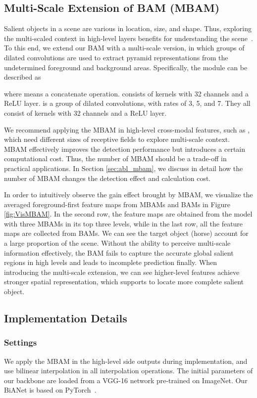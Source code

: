 \documentclass[journal]{IEEEtran}
\newcommand{\secref}[1]{Section \ref{#1}}
\newcommand{\figref}[1]{Figure \ref{#1}}
\begin{document}
\subsection{Multi-Scale Extension of BAM (MBAM)}\label{sec:MBAM}
Salient objects in a scene are various in location, size, and shape.
Thus, exploring the multi-scaled context in high-level layers benefits for understanding the scene~\cite{wang2019salinet,zhao2019pyramid}.
To this end, we extend our BAM with a multi-scale version, in which groups of dilated convolutions are used to extract pyramid representations from the undetermined foreground and background areas.
Specifically, the module can be described as

where  means a concatenate operation.
 consists of  kernels with 32 channels and a ReLU layer.
 is a group of dilated convolutions, with rates of 3, 5, and 7.
They all consist of  kernels with 32 channels and a ReLU layer.

We recommend applying the MBAM in high-level cross-modal features, such as ,
which need different sizes of receptive fields to explore multi-scale context.
MBAM effectively improves the detection performance but introduces a certain computational cost.
Thus, the number of MBAM should be a trade-off in practical applications. 
In \secref{sec:abl_mbam}, we discuss in detail how the number of MBAM changes the detection effect and calculation cost.


In order to intuitively observe the gain effect brought by MBAM,
we visualize the averaged foreground-first feature maps from MBAMs and BAMs in \figref{fig:VisMBAM}.
In the second row,
the feature maps are obtained from the model with three MBAMs in its top three levels,
while in the last row, 
all the feature maps are collected from BAMs. 
We can see the target object (horse) account for a large proportion of the scene.
Without the ability to perceive multi-scale information effectively,
the BAM fails to capture the accurate global salient regions in high levels
and leads to incomplete prediction finally.
When introducing the multi-scale extension, 
we can see higher-level features achieve stronger spatial representation,
which supports to locate more complete salient object.

\subsection{Implementation Details}
\subsubsection{Settings}
We apply the MBAM in the high-level side outputs  during implementation,
and use bilinear interpolation in all interpolation operations.
The initial parameters of our backbone are loaded from a VGG-16 network pre-trained on ImageNet.
Our BiANet is based on PyTorch~\cite{pytorch2019paszke}.
\end{document}
